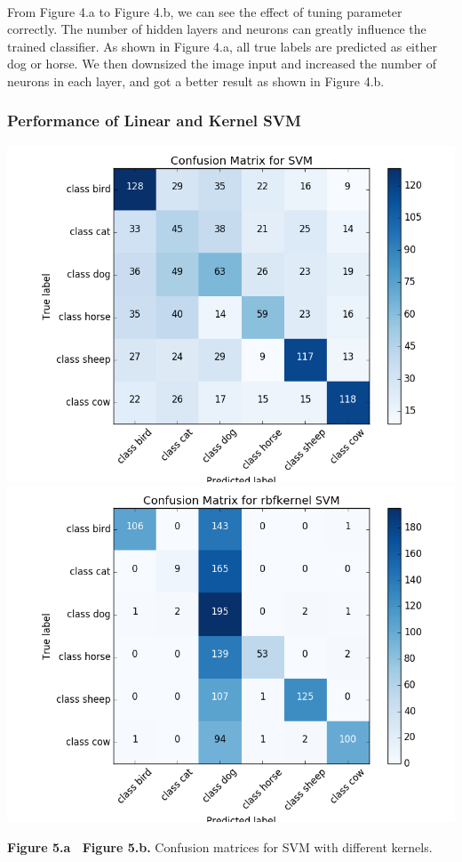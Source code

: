 \documentclass{article}
\begin{document}
\paragraph{}
From Figure 4.a to Figure 4.b, we can see the effect of tuning parameter correctly. The number of hidden layers and neurons can greatly influence the trained classifier. As shown in Figure 4.a, all true labels are predicted as either dog or horse. We then downsized the image input and increased the number of neurons in each layer, and got a better result as shown in Figure 4.b.
 

\subsubsection{Performance of Linear and Kernel SVM}
\includegraphics[scale=0.38]{svm_cm_new.png}
\includegraphics[scale=0.38]{kernelSVM_cm_new.png}
\begin{center}
\textbf{ Figure 5.a \ Figure 5.b.} Confusion matrices for SVM with different kernels.

\end{center}
\end{document}
